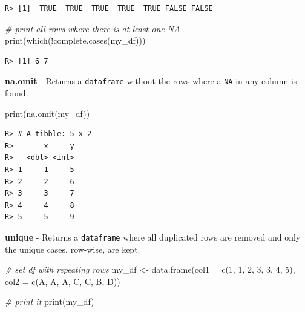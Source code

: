 \documentclass[
  12pt,
]{book}
\newenvironment{Shaded}{\begin{snugshade}}{\end{snugshade}}
\newcommand{\AttributeTok}[1]{\textcolor[rgb]{0.61,0.61,0.61}{#1}}
\newcommand{\CommentTok}[1]{\textcolor[rgb]{0.37,0.37,0.37}{\textit{#1}}}
\newcommand{\DecValTok}[1]{\textcolor[rgb]{0.06,0.06,0.06}{#1}}
\newcommand{\FunctionTok}[1]{\textcolor[rgb]{0,0,0}{#1}}
\newcommand{\NormalTok}[1]{#1}
\newcommand{\OtherTok}[1]{\textcolor[rgb]{0.37,0.37,0.37}{#1}}
\newcommand{\SpecialCharTok}[1]{\textcolor[rgb]{0,0,0}{#1}}
\newcommand{\StringTok}[1]{\textcolor[rgb]{0.5,0.5,0.5}{#1}}
\begin{document}
\begin{verbatim}
R> [1]  TRUE  TRUE  TRUE  TRUE  TRUE FALSE FALSE
\end{verbatim}

\begin{Shaded}
\begin{Highlighting}[]
\CommentTok{\# print all rows where there is at least one NA}
\FunctionTok{print}\NormalTok{(}\FunctionTok{which}\NormalTok{(}\SpecialCharTok{!}\FunctionTok{complete.cases}\NormalTok{(my\_df)))}
\end{Highlighting}
\end{Shaded}

\begin{verbatim}
R> [1] 6 7
\end{verbatim}

\textbf{na.omit} - Returns a \texttt{dataframe} without the rows where a \texttt{NA} in any column is found. 

\begin{Shaded}
\begin{Highlighting}[]
\FunctionTok{print}\NormalTok{(}\FunctionTok{na.omit}\NormalTok{(my\_df))}
\end{Highlighting}
\end{Shaded}

\begin{verbatim}
R> # A tibble: 5 x 2
R>       x     y
R>   <dbl> <int>
R> 1     1     5
R> 2     2     6
R> 3     3     7
R> 4     4     8
R> 5     5     9
\end{verbatim}

\textbf{unique} - Returns a \texttt{dataframe} where all duplicated rows are removed and only the unique cases, row-wise, are kept. 

\begin{Shaded}
\begin{Highlighting}[]
\CommentTok{\# set df with repeating rows}
\NormalTok{my\_df }\OtherTok{\textless{}{-}} \FunctionTok{data.frame}\NormalTok{(}\AttributeTok{col1 =} \FunctionTok{c}\NormalTok{(}\DecValTok{1}\NormalTok{, }\DecValTok{1}\NormalTok{, }\DecValTok{2}\NormalTok{, }\DecValTok{3}\NormalTok{, }\DecValTok{3}\NormalTok{, }\DecValTok{4}\NormalTok{, }\DecValTok{5}\NormalTok{), }
                    \AttributeTok{col2 =} \FunctionTok{c}\NormalTok{(}\StringTok{\textquotesingle{}A\textquotesingle{}}\NormalTok{, }\StringTok{\textquotesingle{}A\textquotesingle{}}\NormalTok{, }\StringTok{\textquotesingle{}A\textquotesingle{}}\NormalTok{, }\StringTok{\textquotesingle{}C\textquotesingle{}}\NormalTok{, }\StringTok{\textquotesingle{}C\textquotesingle{}}\NormalTok{, }\StringTok{\textquotesingle{}B\textquotesingle{}}\NormalTok{, }\StringTok{\textquotesingle{}D\textquotesingle{}}\NormalTok{))}

\CommentTok{\# print it                  }
\FunctionTok{print}\NormalTok{(my\_df)}
\end{Highlighting}
\end{Shaded}
\end{document}
